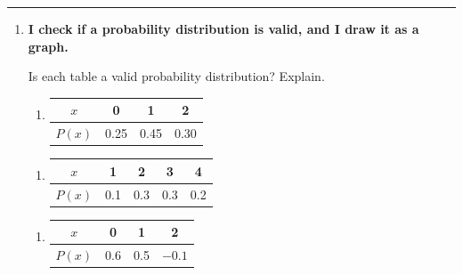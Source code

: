 \documentclass[11pt]{article}
\newcommand{\lessonhead}[1]{\par\vspace{0.6em}{\large\bfseries #1}\par\vspace{0.25em}\hrule\vspace{0.6em}}
\newcommand{\goal}[1]{\textbf{#1}\par\vspace{0.35em}}
\begin{document}
\partner

\newpage
\lessonhead{7.1 - Probability Distributions}
\begin{enumerate}

\item \goal{I check if a probability distribution is valid, and I draw it as a graph.}
Is each table a valid probability distribution? Explain.

\vspace{0.4em}
\renewcommand{\arraystretch}{1.4}
\begin{minipage}[t]{0.48\linewidth}\vspace{0pt}\raggedright
\begin{enumerate}
  \item \begin{tabular}[t]{|c|c|c|c|}\hline $x$ & 0 & 1 & 2\\ \hline $P(x)$ & 0.25 & 0.45 & 0.30\\ \hline\end{tabular}

  \vspace{0.3em}
  \work{3em}
\end{enumerate}
\end{minipage}\hfill
\begin{minipage}[t]{0.48\linewidth}\vspace{0pt}\raggedright
\begin{enumerate}[start=2]
  \item \begin{tabular}[t]{|c|c|c|c|c|}\hline $x$ & 1 & 2 & 3 & 4\\ \hline $P(x)$ & 0.1 & 0.3 & 0.3 & 0.2\\ \hline\end{tabular}

  \vspace{0.3em}
  \work{3em}
\end{enumerate}
\end{minipage}

\vspace{0.8em}
\begin{minipage}[t]{0.48\linewidth}\vspace{0pt}\raggedright
\begin{enumerate}[start=3]
  \item \begin{tabular}[t]{|c|c|c|c|}\hline $x$ & 0 & 1 & 2\\ \hline $P(x)$ & 0.6 & 0.5 & $-0.1$\\ \hline\end{tabular}


\end{enumerate}
\end{minipage}
\end{enumerate}
\end{document}

